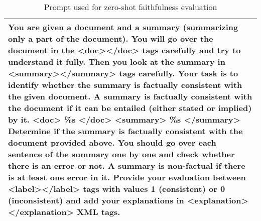 \begin{table*}
\centering
\small
\begin{tabular}{@{}p{14cm}@{}}
\toprule
You are given a document and a summary (summarizing only a part of the document). You will go over the document in the <doc></doc> tags carefully and try to understand it fully. Then you look at the summary in <summary></summary> tags carefully. Your task is to identify whether the summary is factually consistent with the given document. A summary is factually consistent with the document if it can be entailed (either stated or implied) by it.
\newline
\newline
    <doc>
    \newline
    \%s
    \newline
    </doc>
    \newline
    \newline
    <summary>
    \newline
    \%s
    \newline
    </summary>
    \newline
    \newline
    Determine if the summary is factually consistent with the document provided above. You should go over each sentence of the summary one by one and check whether there is an error or not. A summary is non-factual if there is at least one error in it. Provide your evaluation between <label></label> tags with values 1 (consistent) or 0 (inconsistent) and add your explanations in <explanation></explanation> XML tags.
    \\ 
 \bottomrule
\end{tabular}
\caption{Prompt used for zero-shot faithfulness evaluation}
\label{tab:direc_prompt}
\end{table*}